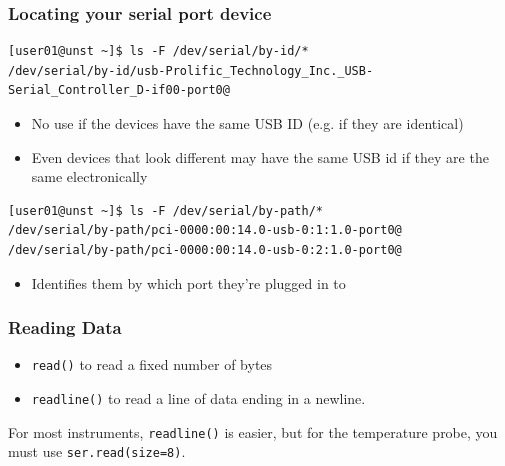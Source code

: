 \documentclass[aspectratio=1610,9pt]{beamer} %
\begin{document}
\begin{frame}[fragile]
\frametitle{Locating your serial port device}


\begin{verbatim}
[user01@unst ~]$ ls -F /dev/serial/by-id/*
/dev/serial/by-id/usb-Prolific_Technology_Inc._USB-Serial_Controller_D-if00-port0@
\end{verbatim}

\begin{itemize}
\itemsep1pt\parskip0pt
\item
  No use if the devices have the same USB ID (e.g. if they are
  identical)
\item
  Even devices that look different may have the same USB id if they are
  the same electronically
\end{itemize}


\begin{verbatim}
[user01@unst ~]$ ls -F /dev/serial/by-path/*
/dev/serial/by-path/pci-0000:00:14.0-usb-0:1:1.0-port0@
/dev/serial/by-path/pci-0000:00:14.0-usb-0:2:1.0-port0@
\end{verbatim}

\begin{itemize}
\itemsep1pt\parskip0pt
\item
  Identifies them by which port they're plugged in to
\end{itemize}

\end{frame}
\begin{frame}[fragile]
\frametitle{Reading Data}

\begin{itemize}
\item \texttt{read()} to read a fixed number of bytes 
\item \texttt{readline()} to read a line of data ending in a newline.
\end{itemize}

For most instruments, \texttt{readline()} is easier, but for the 
temperature probe, you must use \texttt{ser.read(size=8)}.
\end{frame}
\end{document}
